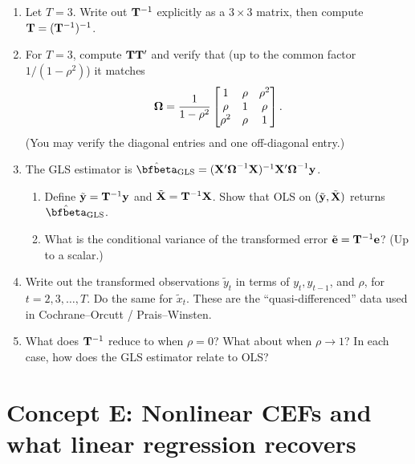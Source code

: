 \documentclass{article}
\begin{document}
\begin{enumerate}[label=\textbf{D.\arabic*},leftmargin=*,itemsep=10pt]

\item  Let $T = 3$.  Write out ${\mathbf T}^{-1}$ explicitly as a $3\times 3$ matrix, then compute ${\mathbf T} = ({\mathbf T}^{-1})^{-1}$.

\item  For $T = 3$, compute ${\mathbf T}{\mathbf T}'$ and verify that (up to the common factor $1/(1-\rho^2)$) it matches
$$\mbox{\boldmath $\Omega$} = \frac{1}{1-\rho^2}\begin{bmatrix}1 & \rho & \rho^2 \\ \rho & 1 & \rho \\ \rho^2 & \rho & 1\end{bmatrix}.$$
(You may verify the diagonal entries and one off-diagonal entry.)

\item  The GLS estimator is $\hat\bfbeta_{\text{GLS}} = (\bfX'\bfOmega^{-1}\bfX)^{-1}\bfX'\bfOmega^{-1}\bfy$.
\begin{enumerate}[label=(\alph*)]
  \item Define $\tilde{{\mathbf y}} = {\mathbf T}^{-1}{\mathbf y}$ and $\tilde{{\mathbf X}} = {\mathbf T}^{-1}{\mathbf X}$.  Show that OLS on $(\tilde{{\mathbf y}}, \tilde{{\mathbf X}})$ returns $\hat\bfbeta_{\text{GLS}}$.
  \item What is the conditional variance of the transformed error $\tilde{{\mathbf e}} = {\mathbf T}^{-1}{\mathbf e}$?  (Up to a scalar.)
\end{enumerate}

\item  Write out the transformed observations $\tilde y_t$ in terms of $y_t, y_{t-1}$, and $\rho$, for $t = 2, 3, \ldots, T$.  Do the same for $\tilde x_t$.  These are the ``quasi-differenced'' data used in Cochrane--Orcutt / Prais--Winsten.

\item  What does ${\mathbf T}^{-1}$ reduce to when $\rho = 0$?  What about when $\rho \to 1$?  In each case, how does the GLS estimator relate to OLS?

\end{enumerate}

\bigskip

\section*{Concept E: Nonlinear CEFs and what linear regression recovers}
\end{document}
